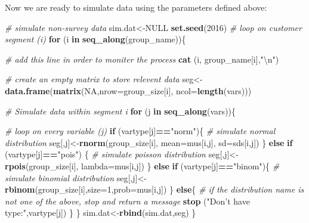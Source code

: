 \documentclass[12pt,]{krantz}
\makeatletter
\newenvironment{Shaded}{\begin{snugshade}}{\end{snugshade}}
\newcommand{\KeywordTok}[1]{\textcolor[rgb]{0.27,0.27,0.27}{\textbf{#1}}}
\newcommand{\DataTypeTok}[1]{\textcolor[rgb]{0.27,0.27,0.27}{#1}}
\newcommand{\DecValTok}[1]{\textcolor[rgb]{0.06,0.06,0.06}{#1}}
\newcommand{\CharTok}[1]{\textcolor[rgb]{0.5,0.5,0.5}{#1}}
\newcommand{\StringTok}[1]{\textcolor[rgb]{0.5,0.5,0.5}{#1}}
\newcommand{\CommentTok}[1]{\textcolor[rgb]{0.37,0.37,0.37}{\textit{#1}}}
\newcommand{\OtherTok}[1]{\textcolor[rgb]{0.37,0.37,0.37}{#1}}
\newcommand{\ControlFlowTok}[1]{\textcolor[rgb]{0.27,0.27,0.27}{\textbf{#1}}}
\newcommand{\OperatorTok}[1]{\textcolor[rgb]{0.43,0.43,0.43}{\textbf{#1}}}
\newcommand{\NormalTok}[1]{#1}
\newenvironment{kframe}{%
\medskip{}
\setlength{\fboxsep}{.8em}
 \def\at@end@of@kframe{}%
 \ifinner\ifhmode%
  \def\at@end@of@kframe{\end{minipage}}%
  \begin{minipage}{\columnwidth}%
 \fi\fi%
 \def\FrameCommand##1{\hskip\@totalleftmargin \hskip-\fboxsep
 \colorbox{shadecolor}{##1}\hskip-\fboxsep
     \hskip-\linewidth \hskip-\@totalleftmargin \hskip\columnwidth}%
 \MakeFramed {\advance\hsize-\width
   \@totalleftmargin\z@ \linewidth\hsize
   \@setminipage}}%
 {\par\unskip\endMakeFramed%
 \at@end@of@kframe}
\renewenvironment{Shaded}{\begin{kframe}}{\end{kframe}}
\theoremstyle{definition}
\theoremstyle{definition}
\theoremstyle{definition}
\theoremstyle{remark}
\makeatother
\begin{document}
Now we are ready to simulate data using the parameters defined above:

\begin{Shaded}
\begin{Highlighting}[]
\CommentTok{# simulate non-survey data}
\NormalTok{sim.dat<-}\OtherTok{NULL}
\KeywordTok{set.seed}\NormalTok{(}\DecValTok{2016}\NormalTok{)}
\CommentTok{# loop on customer segment (i)}
 \ControlFlowTok{for}\NormalTok{ (i }\ControlFlowTok{in} \KeywordTok{seq_along}\NormalTok{(group_name))\{}
 
   \CommentTok{# add this line in order to moniter the process}
   \KeywordTok{cat}\NormalTok{ (i, group_name[i],}\StringTok{"}\CharTok{\textbackslash{}n}\StringTok{"}\NormalTok{)}
 
  \CommentTok{# create an empty matrix to store relevent data}
\NormalTok{  seg<-}\KeywordTok{data.frame}\NormalTok{(}\KeywordTok{matrix}\NormalTok{(}\OtherTok{NA}\NormalTok{,}\DataTypeTok{nrow=}\NormalTok{group_size[i], }\DataTypeTok{ncol=}\KeywordTok{length}\NormalTok{(vars)))  }
 
  \CommentTok{# Simulate data within segment i}
  \ControlFlowTok{for}\NormalTok{ (j }\ControlFlowTok{in} \KeywordTok{seq_along}\NormalTok{(vars))\{}
 
    \CommentTok{# loop on every variable (j)}
    \ControlFlowTok{if}\NormalTok{ (vartype[j]}\OperatorTok{==}\StringTok{"norm"}\NormalTok{)\{}
      \CommentTok{# simulate normal distribution}
\NormalTok{      seg[,j]<-}\KeywordTok{rnorm}\NormalTok{(group_size[i], }\DataTypeTok{mean=}\NormalTok{mus[i,j], }\DataTypeTok{sd=}\NormalTok{sds[i,j])}
\NormalTok{    \} }\ControlFlowTok{else} \ControlFlowTok{if}\NormalTok{ (vartype[j]}\OperatorTok{==}\StringTok{"pois"}\NormalTok{) \{}
      \CommentTok{# simulate poisson distribution}
\NormalTok{      seg[,j]<-}\KeywordTok{rpois}\NormalTok{(group_size[i], }\DataTypeTok{lambda=}\NormalTok{mus[i,j])}
\NormalTok{    \} }\ControlFlowTok{else} \ControlFlowTok{if}\NormalTok{ (vartype[j]}\OperatorTok{==}\StringTok{"binom"}\NormalTok{)\{}
      \CommentTok{# simulate binomial distribution}
\NormalTok{      seg[,j]<-}\KeywordTok{rbinom}\NormalTok{(group_size[i],}\DataTypeTok{size=}\DecValTok{1}\NormalTok{,}\DataTypeTok{prob=}\NormalTok{mus[i,j])}
\NormalTok{    \} }\ControlFlowTok{else}\NormalTok{\{}
      \CommentTok{# if the distribution name is not one of the above, stop and return a message}
      \KeywordTok{stop}\NormalTok{ (}\StringTok{"Don't have type:"}\NormalTok{,vartype[j])}
\NormalTok{    \}        }
\NormalTok{  \}}
\NormalTok{  sim.dat<-}\KeywordTok{rbind}\NormalTok{(sim.dat,seg)}
\NormalTok{ \}}
\end{Highlighting}
\end{Shaded}
\end{document}
